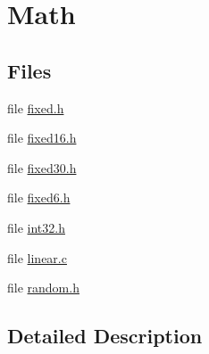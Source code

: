 \hypertarget{group__math}{\section{Math}
\label{group__math}
}
\subsection*{Files}
\begin{DoxyCompactItemize}
\item 
file \hyperlink{fixed_8h}{fixed.\-h}
\item 
file \hyperlink{fixed16_8h}{fixed16.\-h}
\item 
file \hyperlink{fixed30_8h}{fixed30.\-h}
\item 
file \hyperlink{fixed6_8h}{fixed6.\-h}
\item 
file \hyperlink{int32_8h}{int32.\-h}
\item 
file \hyperlink{linear_8c}{linear.\-c}
\item 
file \hyperlink{random_8h}{random.\-h}
\end{DoxyCompactItemize}


\subsection{Detailed Description}
